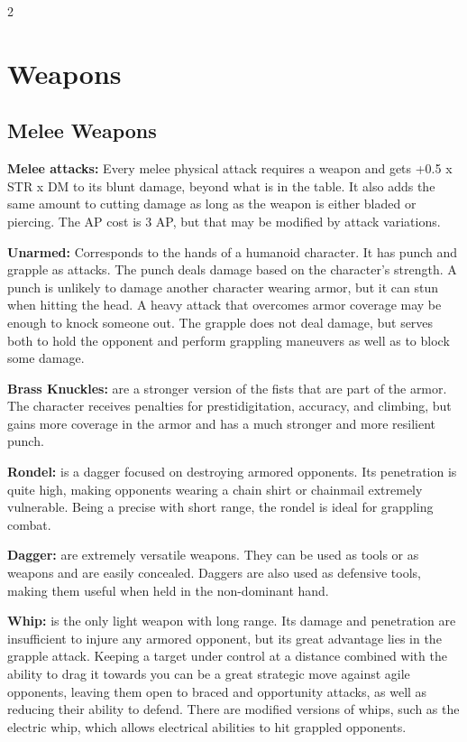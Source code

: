 \begin{multicols}{2}

\section{ Weapons}

\subsection{Melee Weapons}

\textbf{Melee attacks:} Every melee physical attack requires a weapon and gets +0.5 x STR x DM to its blunt damage, beyond what is in the table. It also adds the same amount to cutting damage as long as the weapon is either bladed or piercing. The AP cost is 3 AP, but that may be modified by attack variations.

\textbf{ Unarmed:} Corresponds to the hands of a humanoid character. It has punch and grapple as attacks. The punch deals damage based on the character's strength. A punch is unlikely to damage another character wearing armor, but it can stun when hitting the head. A heavy attack that overcomes armor coverage may be enough to knock someone out. The grapple does not deal damage, but serves both to hold the opponent and perform grappling maneuvers as well as to block some damage.

\textbf{Brass Knuckles:} are a stronger version of the fists that are part of the armor. The character receives penalties for prestidigitation, accuracy, and climbing, but gains more coverage in the armor and has a much stronger and more resilient punch.

\textbf{Rondel:} is a dagger focused on destroying armored opponents. Its penetration is quite high, making opponents wearing a chain shirt or chainmail extremely vulnerable. Being a precise with short range, the rondel is ideal for grappling combat.

\textbf{Dagger:} are extremely versatile weapons. They can be used as tools or as weapons and are easily concealed. Daggers are also used as defensive tools, making them useful when held in the non-dominant hand.

\textbf{Whip:} is the only light weapon with long range. Its damage and penetration are insufficient to injure any armored opponent, but its great advantage lies in the grapple attack. Keeping a target under control at a distance combined with the ability to drag it towards you can be a great strategic move against agile opponents, leaving them open to braced and opportunity attacks, as well as reducing their ability to defend. There are modified versions of whips, such as the electric whip, which allows electrical abilities to hit grappled opponents.

\end{multicols}

